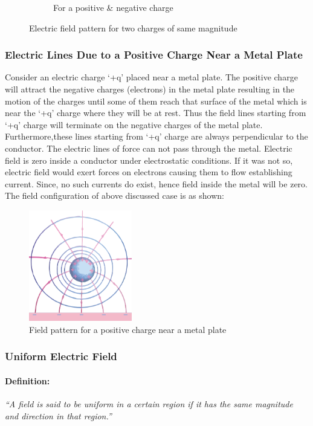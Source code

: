 \begin{figure}[htbp]
\begin{subfigure}[t]{0.3\textwidth}
      \caption{For a positive \& negative charge}
      \label{fig:11.6(b)}
  \end{subfigure}
  \caption[]{Electric field pattern for two charges of same magnitude}
  \label{fig:11.6}
\end{figure}

\subsubsection{Electric Lines Due to a Positive Charge Near a Metal Plate}
Consider an electric charge ‘+q’ placed near a metal plate.
The positive charge will attract the negative charges (electrons) in
the metal plate resulting in the motion of the charges until some
of them reach that surface of the metal which is near the ‘+q’
charge where they will be at rest. Thus the field lines starting from
‘+q’ charge will terminate on the negative charges of the metal plate.
Furthermore,these lines starting from ‘+q’ charge are always perpendicular
to the conductor. The electric lines of force can not pass through the metal.
Electric field is zero inside a conductor under electrostatic conditions.
If it was not so, electric field would exert forces on electrons
causing them to flow establishing current. Since, no such currents do exist,
hence field inside the metal will be zero.
The field configuration of above discussed case is as shown:

\begin{figure}[H]
  \centering
  \includegraphics[width=0.4\textwidth]{Images/11.7.png}
  \caption{Field pattern for a positive charge near a metal plate}
  \label{fig:11.7}
\end{figure}

\subsubsection{Uniform Electric Field}
\paragraph{Definition:}
\textit{“A field is said to be uniform in a certain region 
if it has the same magnitude and direction in that region.”}
